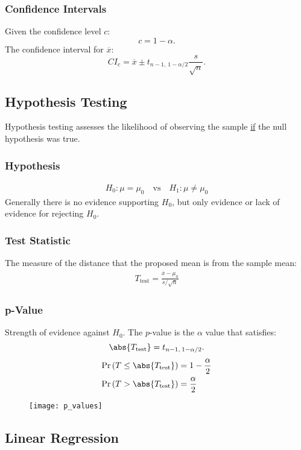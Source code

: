 \documentclass{article}
\begin{document}
\begin{minipage}{126.1962963mm}
    \begin{multicols*}{2}
        \subsubsection*{Confidence Intervals}
        Given the confidence level $c$:
        \begin{equation*}
            c = 1 - \alpha.
        \end{equation*}
        The confidence interval for $\overline{x}$:
        \begin{equation*}
            {CI}_{c} = \overline{x} \pm t_{n-1,\: 1-\alpha/2} \frac{s}{\sqrt{n}}.
        \end{equation*}
        \subsection*{Hypothesis Testing}
        Hypothesis testing assesses the likelihood of observing the sample \underline{if} the null hypothesis was true.
        \subsubsection*{Hypothesis}
        \begin{align*}
            H_0:\mu = \mu_0 \quad \text{vs} \quad H_1:\mu \neq \mu_0
        \end{align*}
        Generally there is no evidence supporting $H_0$, but only evidence or lack of evidence for rejecting $H_0$.
        \subsubsection*{Test Statistic}
        The measure of the distance that the proposed mean is from the sample mean:
        \begin{align*}
            T_{\text{test}} = \frac{\overline{x} - \mu_0}{s/\sqrt{n}}
        \end{align*}
        \subsubsection*{p-Value}
        Strength of evidence against $H_0$. The $p$-value is the $\alpha$ value that satisfies:
        \begin{equation*}
            \abs{T_{\text{test}}} = t_{n-1,\: 1-\alpha/2}.
        \end{equation*}
        \begin{align*}
            \Pr{\left( T \leq \abs{T_{\text{test}}} \right)} & = 1 - \frac{\alpha}{2} \\
            \Pr{\left( T > \abs{T_{\text{test}}} \right)}    & = \frac{\alpha}{2}
        \end{align*}
    \end{multicols*}
    \begin{figure}[H]
        \centering
        \texttt{[image: p\_values]}
    \end{figure}
\end{minipage}
\begin{multicols}{3}
    \subsection*{Linear Regression}
    
\end{multicols}
\end{document}
